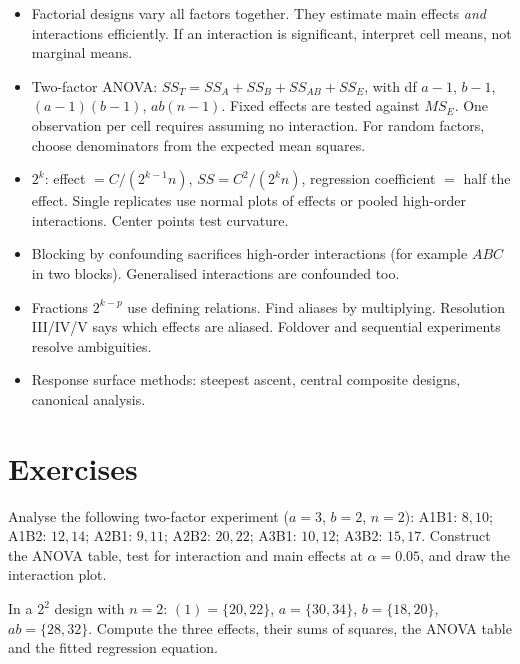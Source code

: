 \begin{summarybox}
\begin{itemize}
  \item Factorial designs vary all factors together. They estimate main effects \emph{and} interactions efficiently. If an interaction is significant, interpret cell means, not marginal means.
  \item Two-factor ANOVA: $SS_T=SS_A+SS_B+SS_{AB}+SS_E$, with df $a-1$, $b-1$, $(a-1)(b-1)$, $ab(n-1)$. Fixed effects are tested against $MS_E$. One observation per cell requires assuming no interaction. For random factors, choose denominators from the expected mean squares.
  \item $2^k$: effect $=C/(2^{k-1}n)$, $SS=C^2/(2^kn)$, regression coefficient $=$ half the effect. Single replicates use normal plots of effects or pooled high-order interactions. Center points test curvature.
  \item Blocking by confounding sacrifices high-order interactions (for example $ABC$ in two blocks). Generalised interactions are confounded too.
  \item Fractions $2^{k-p}$ use defining relations. Find aliases by multiplying. Resolution III/IV/V says which effects are aliased. Foldover and sequential experiments resolve ambiguities.
  \item Response surface methods: steepest ascent, central composite designs, canonical analysis.
\end{itemize}
\end{summarybox}

\section{Exercises}

\begin{exercise}
Analyse the following two-factor experiment ($a=3$, $b=2$, $n=2$): A1B1: $8,10$; A1B2: $12,14$; A2B1: $9,11$; A2B2: $20,22$; A3B1: $10,12$; A3B2: $15,17$. Construct the ANOVA table, test for interaction and main effects at $\alpha=0.05$, and draw the interaction plot.
\end{exercise}

\begin{exercise}
In a $2^2$ design with $n=2$: $(1)=\{20,22\}$, $a=\{30,34\}$, $b=\{18,20\}$, $ab=\{28,32\}$. Compute the three effects, their sums of squares, the ANOVA table and the fitted regression equation.
\end{exercise}

